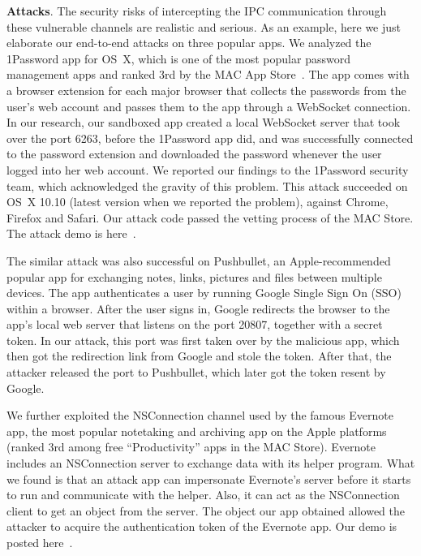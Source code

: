 \documentclass{article}
\newcommand{\ignore}[1]{}
\begin{document}
\vspace {3pt}\noindent\textbf{Attacks}. The security risks of intercepting the IPC communication through these vulnerable channels are realistic and serious. As an example, here we just elaborate our end-to-end attacks on three popular apps.\ignore{ More information is available in Section~\ref{subsec:impact}.} We analyzed the 1Password app for OS~X, which is one of the most popular password management apps and ranked 3rd by the MAC App Store~\cite{1pass}. The app comes with a browser extension for each major browser that collects the passwords from the user's web account and passes them to the app through a WebSocket connection. In our research, our sandboxed app created a local WebSocket server that took over the port 6263, before the 1Password app did, and was successfully connected to the password extension and downloaded the password whenever the user logged into her web account.\ignore{ Also, our attack extension with a permission to visit only a specific domain was able to steal the passwords for other domains, including Facebook, Google, etc., from the 1Password app through a WebSocket connection to its port.}  We reported our findings to the 1Password security team, which acknowledged the gravity of this problem.  This attack succeeded on OS~X 10.10 (latest version when we reported the problem), against Chrome, Firefox and Safari. Our attack code passed the vetting process of the MAC Store. The attack demo is here~\cite{supporting}.

The similar attack was also successful on Pushbullet, an Apple-recommended popular app for exchanging notes, links, pictures and files between multiple devices. The app authenticates a user by running Google Single Sign On (SSO) within a browser. After the user signs in, Google redirects the browser to the app's local web server that listens on the port 20807, together with a secret token.  In our attack, this port was first taken over by the malicious app, which then got the redirection link from Google and stole the token. After that, the attacker released the port to Pushbullet, which later got the token resent by Google.

We further exploited the NSConnection channel used by the famous Evernote app, the most popular notetaking and archiving app on the Apple platforms (ranked 3rd among free ``Productivity'' apps in the MAC Store).  Evernote includes an NSConnection server to exchange data with its helper program.  What we found is that an attack app can impersonate Evernote's server before it starts to run and communicate with the helper.  Also, it can act as the NSConnection client to get an object from the server.  The object our app obtained allowed the attacker to acquire the authentication token of the Evernote app.  Our demo is posted here~\cite{supporting}. 
\end{document}
